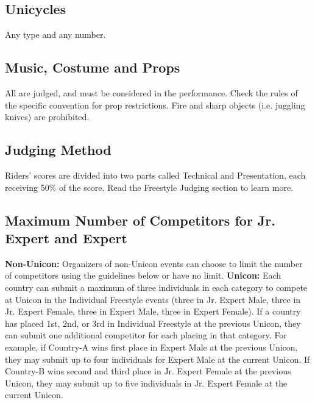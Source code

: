 \subsection{Unicycles}
Any type and any number.

\subsection{Music, Costume and Props}
All are judged, and must be considered in the performance.
Check the rules of the specific convention for prop restrictions.
Fire and sharp objects (i.e. juggling knives) are prohibited.

\subsection{Judging Method}
Riders' scores are divided into two parts called Technical and Presentation, each receiving 50\% of the score.
Read the Freestyle Judging section to learn more.

\subsection{Maximum Number of Competitors for Jr. Expert and Expert}
\textbf{Non-Unicon:} Organizers of non-Unicon events can choose to limit the number of competitors using the guidelines below or have no limit.
\textbf{Unicon:} Each country can submit a maximum of three individuals in each category to compete at Unicon in the Individual Freestyle events (three in Jr. Expert Male, three in Jr. Expert Female, three in Expert Male, three in Expert Female).
If a country has placed 1st, 2nd, or 3rd in Individual Freestyle at the previous Unicon, they can submit one additional competitor for each placing in that category.
For example, if Country-A wins first place in Expert Male at the previous Unicon, they may submit up to four individuals for Expert Male at the current Unicon.
If Country-B wins second and third place in Jr. Expert Female at the previous Unicon, they may submit up to five individuals in Jr. Expert Female at the current Unicon.

